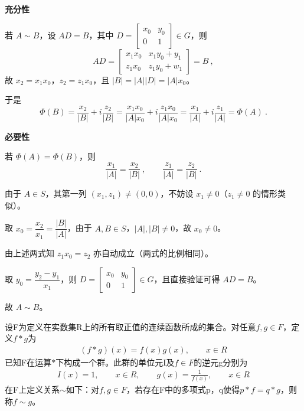 \begin{questions}
\begin{parts}
\begin{subparts}
\begin{solution}
\textbf{充分性}

若 $A\sim B$，设 $AD=B$，其中 $D=\begin{bmatrix}x_0&y_0\\0&1\end{bmatrix}\in G$，则
\[
AD=\begin{bmatrix}x_1x_0&x_1y_0+y_1\\z_1x_0&z_1y_0+w_1\end{bmatrix}=B\ ,
\]
故 $x_2=x_1x_0$，$z_2=z_1x_0$，且 $|B|=|A||D|=|A|x_0$。

于是
\[
\Phi(B)=\frac{x_2}{|B|}+i\frac{z_2}{|B|}=\frac{x_1x_0}{|A|x_0}+i\frac{z_1x_0}{|A|x_0}=\frac{x_1}{|A|}+i\frac{z_1}{|A|}=\Phi(A)\ .
\]

\textbf{必要性}

若 $\Phi(A)=\Phi(B)$，则
\[
\frac{x_1}{|A|}=\frac{x_2}{|B|}\ ,\qquad\frac{z_1}{|A|}=\frac{z_2}{|B|}\ .
\]

由于 $A\in S$，其第一列 $(x_1,z_1)\ne(0,0)$，不妨设 $x_1\ne0$（$z_1\ne0$ 的情形类似）。

取 $x_0=\dfrac{x_2}{x_1}=\dfrac{|B|}{|A|}$，由于 $A,B\in S$，$|A|,|B|\ne0$，故 $x_0\ne0$。

由上述两式知 $z_1x_0=z_2$ 亦自动成立（两式的比例相同）。

取 $y_0=\dfrac{y_2-y_1}{x_1}$，则 $D=\begin{bmatrix}x_0&y_0\\0&1\end{bmatrix}\in G$，且直接验证可得 $AD=B$。

故 $A\sim B$。
\end{solution}
\end{subparts}
\end{parts}

\question 设F为定义在实数集R上的所有取正值的连续函数所成的集合。对任意$f,g\in F$，定义$f*g$为
\begin{align*}
(f*g)(x)=f(x)g(x),\qquad x\in R
\end{align*}
已知F在运算$*$下构成一个群。此群的单位元I及$f\in F$的逆元g分别为
\begin{align*}
I(x)=1,\qquad x\in R,\qquad g(x)=\frac{1}{f(x)},\qquad x\in R
\end{align*}
在F上定义关系$\sim$如下：对$f,g\in F$，若存在F中的多项式p，q使得$p*f=q*g$，则称$f\sim g$。

\end{questions}

